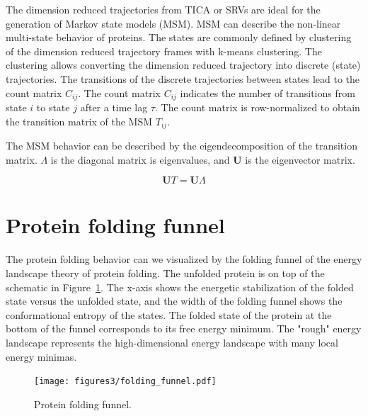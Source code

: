 The dimension reduced trajectories from TICA or SRVs are ideal for the generation of Markov state models (MSM)\cite{Noe2015}. MSM can describe the non-linear multi-state behavior of proteins. The states  are commonly defined by clustering of the dimension reduced trajectory frames with k-means clustering. The clustering allows converting the dimension reduced trajectory into discrete (state) trajectories. The transitions of the discrete trajectories between states lead to the count matrix $C_{ij}$. The count matrix $C_{ij}$ indicates the number of transitions from state $i$ to state $j$ after a time lag $\tau$. The count matrix is row-normalized to obtain the transition matrix of the MSM $T_{ij}$.

The MSM behavior can be described by the eigendecomposition of the transition matrix. $\varLambda$ is the diagonal matrix is eigenvalues, and $\mathbf{U}$ is the eigenvector matrix.

$$\mathbf{U}T=\mathbf{U}\varLambda$$


\section{Protein folding funnel}

The protein folding behavior can we visualized by the folding funnel of the energy landscape theory of protein folding\cite{bryngelson1995p}. The unfolded protein is on top of the schematic in Figure~\ref{fig:funnel}. The x-axis shows the energetic stabilization of the folded state versus the unfolded state, and the width of the folding funnel shows the conformational entropy of the states.  The folded state of the protein at the bottom of the funnel corresponds to its free energy minimum. The "rough" energy landscape represents the high-dimensional energy landscape with many local energy minimas.

\begin{figure}[H]
  \centering
  \texttt{[image: figures3/folding\_funnel.pdf]}
  \caption{Protein folding funnel.}
  \label{fig:funnel}
\end{figure}



